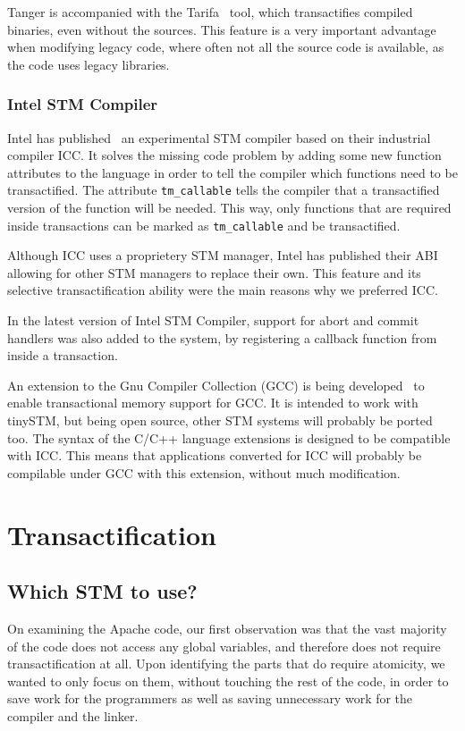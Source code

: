 \documentclass[preprint,11pt]{sigplanconf}
\let \cite = \citep
\begin{document}
{\sc Tanger} is accompanied with the {\sc Tarifa}~\cite{felber2007tanger}
tool, which transactifies compiled binaries, even without the sources. This
feature is a very important advantage when modifying legacy code, where often
not all the source code is available, as the code uses legacy libraries.

\subsubsection{Intel STM Compiler}

Intel has published~\cite{icc} an experimental STM compiler based on their industrial
compiler ICC. It solves the missing code problem by adding some new function attributes
to the language in order to tell the compiler which functions need to be transactified.
The attribute {\tt tm\_callable} tells the compiler that a transactified version
of the function will be needed. This way, only functions that are required inside
transactions can be marked as {\tt tm\_callable} and be transactified.

Although ICC uses a proprietery STM manager, Intel has published their
ABI~\cite{icc:abi} allowing for other STM managers to replace their own. This feature
and its selective transactification ability were the main reasons why we
preferred ICC.

In the latest version of Intel STM Compiler, support for abort and commit
handlers was also added to the system, by registering a callback function
from inside a transaction.

An extension to the Gnu Compiler Collection (GCC) is being developed~\cite{gcctm} to
enable transactional memory support for GCC. It is intended to work with
tinySTM, but being open source, other STM systems will probably be ported too.
The syntax of the C/C++ language extensions is designed to be compatible with
ICC. This means that applications converted for ICC will probably be compilable
under GCC with this extension, without much modification.

\section{Transactification}\label{sec:transactification}
\subsection{Which STM to use?}

On examining the Apache code, our first observation was that
the vast majority of the code does not access any global variables,
and therefore does not require transactification at all.
Upon identifying the parts that do require atomicity,
we wanted to only focus on them, without touching
the rest of the code, in order to save work for the programmers
as well as saving unnecessary work for the compiler and the linker.
\end{document}
